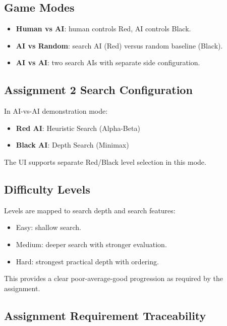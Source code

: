 \documentclass[a4paper,12pt]{article}
\begin{document}
\subsection{Game Modes}

\begin{itemize}
    \item \textbf{Human vs AI}: human controls Red, AI controls Black.
    \item \textbf{AI vs Random}: search AI (Red) versus random baseline (Black).
    \item \textbf{AI vs AI}: two search AIs with separate side configuration.
\end{itemize}

\subsection{Assignment 2 Search Configuration}

In AI-vs-AI demonstration mode:
\begin{itemize}
    \item \textbf{Red AI}: Heuristic Search (Alpha-Beta)
    \item \textbf{Black AI}: Depth Search (Minimax)
\end{itemize}

The UI supports separate Red/Black level selection in this mode.

\subsection{Difficulty Levels}

Levels are mapped to search depth and search features:
\begin{itemize}
    \item Easy: shallow search.
    \item Medium: deeper search with stronger evaluation.
    \item Hard: strongest practical depth with ordering.
\end{itemize}

This provides a clear poor-average-good progression as required by the assignment.

\subsection{Assignment Requirement Traceability}
\end{document}

